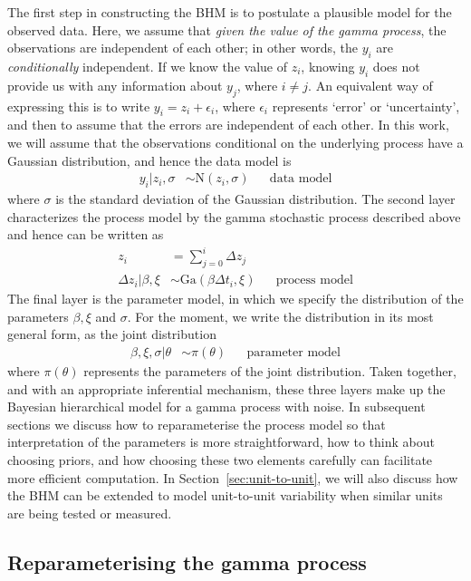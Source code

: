 \documentclass{article}
\begin{document}
The first step in constructing the BHM is to postulate a plausible model for the observed data. Here, we assume that \emph{given the value of the gamma process}, the observations are independent of each other; in other words, the $y_i$ are \emph{conditionally} independent. If we know the value of $z_i$, knowing $y_i$ does not provide us with any information about $y_j$, where $i\neq j$. An equivalent way of expressing this is to write $y_i = z_i + \epsilon_i$, where $\epsilon_i$ represents `error' or `uncertainty', and then to assume that the errors are independent of each other. In this work, we will assume that the observations conditional on the underlying process have a Gaussian distribution, and hence the data model is
\begin{align*}
    y_i|z_i, \sigma & \sim \mbox{N}(z_i, \sigma)  && \mbox{data model} %
\end{align*}
where $\sigma$ is the standard deviation of the Gaussian distribution. The second layer characterizes the process model by the gamma stochastic process described above and hence can be written as 
\begin{align*}
    z_i & = \sum_{j=0}^i \Delta z_j \\ 
    \Delta z_i | \beta, \xi & \sim \mbox{Ga}(\beta \Delta t_i, \xi) && \mbox{process model} %
\end{align*}
The final layer is the parameter model, in which we specify the distribution of the parameters $\beta, \xi$ and $\sigma$. For the moment, we write the distribution in its most general form, as the joint distribution
\begin{align*}
    \beta, \xi, \sigma | \theta & \sim \pi(\theta) && \mbox{parameter model} %
\end{align*}
where $\pi(\theta)$ represents the parameters of the joint distribution. Taken together, and with an appropriate inferential mechanism, these three layers make up the Bayesian hierarchical model for a gamma process with noise. In subsequent sections we discuss how to reparameterise the process model so that interpretation of the parameters is more straightforward, how to think about choosing priors, and how choosing these two elements carefully can facilitate more efficient computation. In Section~\ref{sec:unit-to-unit}, we will also discuss how the BHM can be extended to model unit-to-unit variability when similar units are being tested or measured.

\subsection{Reparameterising the gamma process} \label{subsec:param}
\end{document}
